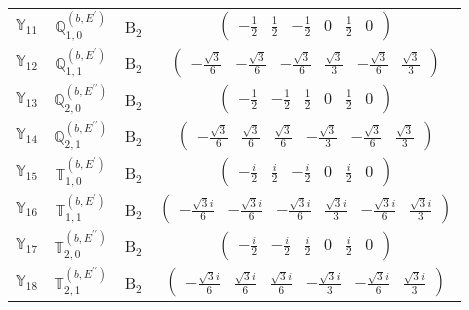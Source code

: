 \documentclass[fleqn,10pt,landscape]{article}
\begin{document}
\begin{itemize}
\begin{center}
\begin{longtable}{c|c|c|c}
$ \mathbb{Y}_{11} $ & $\mathbb{Q}_{1,0}^{(b,E^{\prime})}$ & B$_{2}$ & $\begin{pmatrix} - \frac{1}{2} & \frac{1}{2} & - \frac{1}{2} & 0 & \frac{1}{2} & 0 \end{pmatrix}$ \\
$ \mathbb{Y}_{12} $ & $\mathbb{Q}_{1,1}^{(b,E^{\prime})}$ & B$_{2}$ & $\begin{pmatrix} - \frac{\sqrt{3}}{6} & - \frac{\sqrt{3}}{6} & - \frac{\sqrt{3}}{6} & \frac{\sqrt{3}}{3} & - \frac{\sqrt{3}}{6} & \frac{\sqrt{3}}{3} \end{pmatrix}$ \\
$ \mathbb{Y}_{13} $ & $\mathbb{Q}_{2,0}^{(b,E^{\prime\prime})}$ & B$_{2}$ & $\begin{pmatrix} - \frac{1}{2} & - \frac{1}{2} & \frac{1}{2} & 0 & \frac{1}{2} & 0 \end{pmatrix}$ \\
$ \mathbb{Y}_{14} $ & $\mathbb{Q}_{2,1}^{(b,E^{\prime\prime})}$ & B$_{2}$ & $\begin{pmatrix} - \frac{\sqrt{3}}{6} & \frac{\sqrt{3}}{6} & \frac{\sqrt{3}}{6} & - \frac{\sqrt{3}}{3} & - \frac{\sqrt{3}}{6} & \frac{\sqrt{3}}{3} \end{pmatrix}$ \\
$ \mathbb{Y}_{15} $ & $\mathbb{T}_{1,0}^{(b,E^{\prime})}$ & B$_{2}$ & $\begin{pmatrix} - \frac{i}{2} & \frac{i}{2} & - \frac{i}{2} & 0 & \frac{i}{2} & 0 \end{pmatrix}$ \\
$ \mathbb{Y}_{16} $ & $\mathbb{T}_{1,1}^{(b,E^{\prime})}$ & B$_{2}$ & $\begin{pmatrix} - \frac{\sqrt{3} i}{6} & - \frac{\sqrt{3} i}{6} & - \frac{\sqrt{3} i}{6} & \frac{\sqrt{3} i}{3} & - \frac{\sqrt{3} i}{6} & \frac{\sqrt{3} i}{3} \end{pmatrix}$ \\
$ \mathbb{Y}_{17} $ & $\mathbb{T}_{2,0}^{(b,E^{\prime\prime})}$ & B$_{2}$ & $\begin{pmatrix} - \frac{i}{2} & - \frac{i}{2} & \frac{i}{2} & 0 & \frac{i}{2} & 0 \end{pmatrix}$ \\
$ \mathbb{Y}_{18} $ & $\mathbb{T}_{2,1}^{(b,E^{\prime\prime})}$ & B$_{2}$ & $\begin{pmatrix} - \frac{\sqrt{3} i}{6} & \frac{\sqrt{3} i}{6} & \frac{\sqrt{3} i}{6} & - \frac{\sqrt{3} i}{3} & - \frac{\sqrt{3} i}{6} & \frac{\sqrt{3} i}{3} \end{pmatrix}$ \\ \hline

\end{longtable}
\end{center}
\end{itemize}
\end{document}
